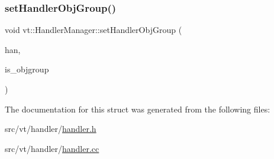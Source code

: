 \mbox{\label{structvt_1_1_handler_manager_a0822ddaf90168e28fc9974e7f672b529}} 
\subsubsection{\texorpdfstring{set\+Handler\+Obj\+Group()}{setHandlerObjGroup()}}
{\footnotesize\ttfamily void vt\+::\+Handler\+Manager\+::set\+Handler\+Obj\+Group (\begin{DoxyParamCaption}\item[{\hyperlink{namespacevt_af64846b57dfcaf104da3ef6967917573}{Handler\+Type} \&}]{han,  }\item[{bool}]{is\+\_\+objgroup }\end{DoxyParamCaption})\hspace{0.3cm}{\ttfamily [static]}}



The documentation for this struct was generated from the following files\+:\begin{DoxyCompactItemize}
\item 
src/vt/handler/\hyperlink{handler_8h}{handler.\+h}\item 
src/vt/handler/\hyperlink{handler_8cc}{handler.\+cc}\end{DoxyCompactItemize}
